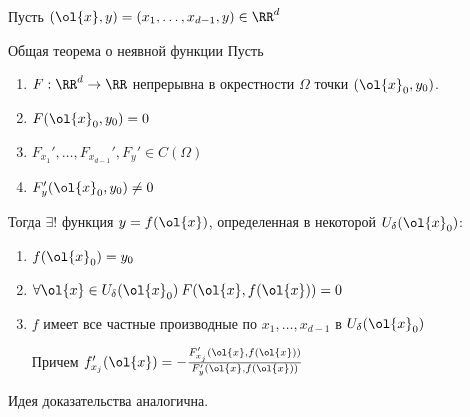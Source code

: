 Пусть \( (\ol{x}, y) = (x_1, \ldots, x_{d - 1}, y) \in \RR^d \)

\begin{thrm}{Общая теорема о неявной функции}{}
    Пусть
    \begin{enumerate}
        \item
            \( F : \RR^d \to \RR \) непрерывна в окрестности \( \Omega \) точки \( (\ol{x}_0, y_0) \).
        \item
            \( F(\ol{x}_0, y_0) = 0 \)
        \item
            \( F_{x_1}', \ldots, F_{x_{d - 1}}', F_y' \in C(\Omega) \)
        \item
            \( F_y' (\ol{x}_0, y_0) \neq 0 \)
    \end{enumerate}

    Тогда \( \exists! \) функция \( y = f(\ol{x}) \),
    определенная в некоторой \( U_{\delta} (\ol{x}_0) \):
    \begin{enumerate}
        \item
            \( f(\ol{x}_0) = y_0 \)
        \item
            \( \forall \ol{x} \in U_{\delta} (\ol{x}_0) \: F(\ol{x}, f(\ol{x})) = 0 \)
        \item
            \( f \) имеет все частные производные по \( x_1, \ldots, x_{d - 1} \) в \( U_{\delta}(\ol{x}_0) \)

            Причем \( f_{x_j}' (\ol{x}) = -\frac{F_{x_j}' (\ol{x}, f(\ol{x}))}{F_y' (\ol{x}, f(\ol{x}))} \)
    \end{enumerate}
\end{thrm}

Идея доказательства аналогична.

